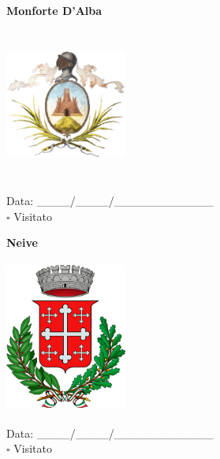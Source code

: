 \documentclass[a5paper,12pt]{article}
\begin{document}
\vspace{0.7cm}

\noindent
\begin{minipage}[t]{0.45\textwidth}
    \begin{center}
        \textbf{Monforte D'Alba}
    \end{center}
    \vspace{-0.5cm} %
    \begin{center}
        \includegraphics[height= 5cm, width=4cm]{Piemonte/Stemma Monforte d'Alba.png}
    \end{center}
    \vspace{-0.4cm} %
    \begin{flushleft}
        Data: \_\_\_\_/\_\_\_\_/\_\_\_\_\_\_\_\_\_\_\_\_ \\
        $\square$ Visitato
    \end{flushleft}
\end{minipage}
\hfill
\noindent
\begin{minipage}[t]{0.45\textwidth}
    \begin{center}
        \textbf{Neive}
    \end{center}
    \vspace{-0.5cm} %
    \begin{center}
        \includegraphics[height= 5cm, width=4cm]{Piemonte/Stemma Neive.png}
    \end{center}
    \vspace{-0.4cm} %
    \begin{flushleft}
        Data: \_\_\_\_/\_\_\_\_/\_\_\_\_\_\_\_\_\_\_\_\_ \\
        $\square$ Visitato
    \end{flushleft}
\end{minipage}
\end{document}
